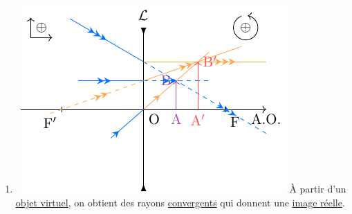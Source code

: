 \documentclass[../../main/main.tex]{subfiles}
\begin{document}
{\begin{multicols}{2}
\begin{enumerate}
			\item ~\smallbreak\includegraphics[width=\linewidth]{divBF}
			      À partir d'un \underline{objet virtuel}, on obtient des rayons
			      \underline{convergents} qui donnent une \underline{image réelle}.


\end{enumerate}
\end{multicols}}
\end{document}
